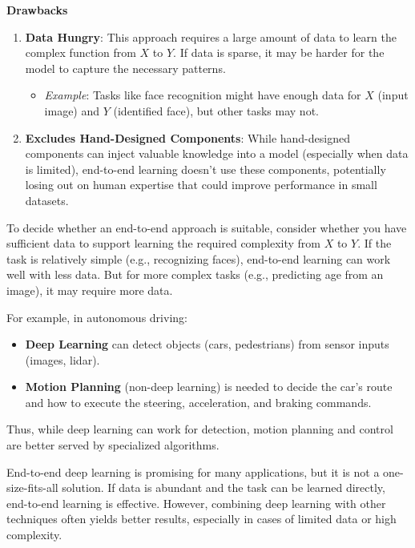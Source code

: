 \documentclass[letterpaper,12pt,notitlepage,twoside]{report}
\begin{document}
\textbf{Drawbacks}
\begin{enumerate}
    \item \textbf{Data Hungry}: This approach requires a large amount of data to learn the complex function from \(X\) to \(Y\). If data is sparse, it may be harder for the model to capture the necessary patterns.
    \begin{itemize}
        \item \textit{Example}: Tasks like face recognition might have enough data for \(X\) (input image) and \(Y\) (identified face), but other tasks may not.
    \end{itemize}
    \item \textbf{Excludes Hand-Designed Components}: While hand-designed components can inject valuable knowledge into a model (especially when data is limited), end-to-end learning doesn't use these components, potentially losing out on human expertise that could improve performance in small datasets.
\end{enumerate}

To decide whether an end-to-end approach is suitable, consider whether you have sufficient data to support learning the required complexity from \(X\) to \(Y\). If the task is relatively simple (e.g., recognizing faces), end-to-end learning can work well with less data. But for more complex tasks (e.g., predicting age from an image), it may require more data.

For example, in autonomous driving:
\begin{itemize}
    \item \textbf{Deep Learning} can detect objects (cars, pedestrians) from sensor inputs (images, lidar).
    \item \textbf{Motion Planning} (non-deep learning) is needed to decide the car’s route and how to execute the steering, acceleration, and braking commands.
\end{itemize}
Thus, while deep learning can work for detection, motion planning and control are better served by specialized algorithms.

End-to-end deep learning is promising for many applications, but it is not a one-size-fits-all solution. If data is abundant and the task can be learned directly, end-to-end learning is effective. However, combining deep learning with other techniques often yields better results, especially in cases of limited data or high complexity.
\end{document}
